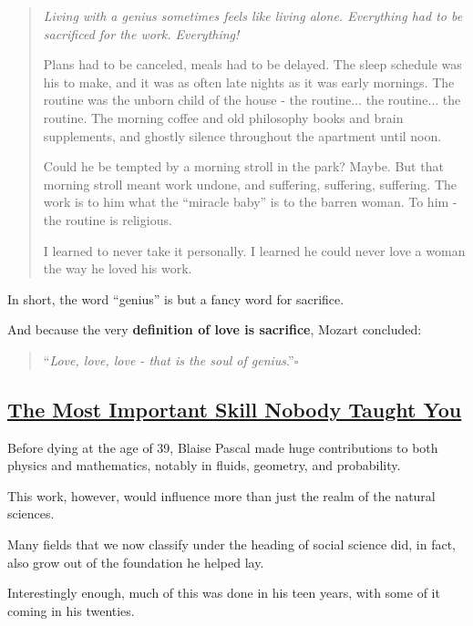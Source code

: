 \documentclass{article}
\begin{document}
\begin{quotation}
	\it
	Living with a genius sometimes feels like living alone. Everything had to be sacrificed for the work. Everything!
	
	Plans had to be canceled, meals had to be delayed. The sleep schedule was his to make, and it was as often late nights as it was early mornings. The routine was the unborn child of the house - the routine$\ldots$ the routine$\ldots$ the routine. The morning coffee and old philosophy books and brain supplements, and ghostly silence throughout the apartment until noon.
	
	Could he be tempted by a morning stroll in the park? Maybe. But that morning stroll meant work undone, and suffering, suffering, suffering. The work is to him what the ``miracle baby'' is to the barren woman. To him - the routine is religious.
	
	I learned to never take it personally. I learned he could never love a woman the way he loved his work.
\end{quotation}
In short, the word ``genius'' is but a fancy word for sacrifice.

And because the very \textbf{definition of love is sacrifice}, Mozart concluded:

\begin{quotation}
	``\textit{Love, love, love - that is the soul of genius}.''\hfill$\square$
\end{quotation}


\subsection{\href{https://medium.com/personal-growth/the-most-important-skill-nobody-taught-you-9b162377ab77}{The Most Important Skill Nobody Taught You}}

Before dying at the age of 39, Blaise Pascal made huge contributions to both physics and mathematics, notably in fluids, geometry, and probability.

%
This work, however, would influence more than just the realm of the natural sciences.

Many fields that we now classify under the heading of social science did, in fact, also grow out of the foundation he helped lay.

%
Interestingly enough, much of this was done in his teen years, with some of it coming in his twenties.
\end{document}
